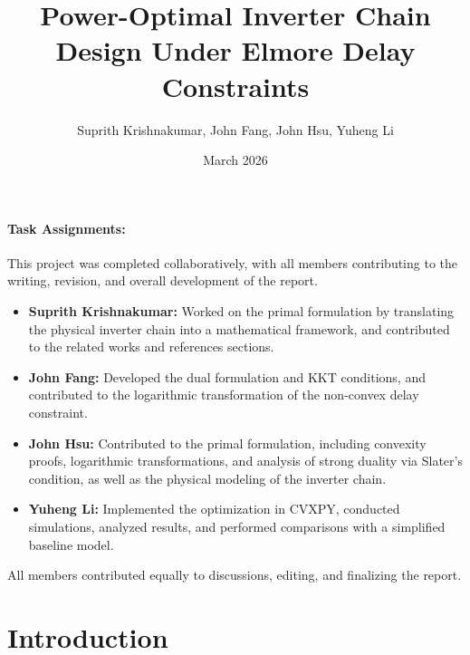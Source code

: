 \documentclass{article}
\title{Power-Optimal Inverter Chain Design Under Elmore Delay Constraints}
\author{Suprith Krishnakumar, John Fang, John Hsu, Yuheng Li}
\date{March 2026}
\begin{document}
\maketitle

\paragraph{Task Assignments:}

This project was completed collaboratively, with all members contributing to the writing, revision, and overall development of the report.

\begin{itemize}
    \item \textbf{Suprith Krishnakumar:} Worked on the primal formulation by translating the physical inverter chain into a mathematical framework, and contributed to the related works and references sections.
    
    \item \textbf{John Fang:} Developed the dual formulation and KKT conditions, and contributed to the logarithmic transformation of the non-convex delay constraint.
    
    \item \textbf{John Hsu:} Contributed to the primal formulation, including convexity proofs, logarithmic transformations, and analysis of strong duality via Slater’s condition, as well as the physical modeling of the inverter chain.
    
    \item \textbf{Yuheng Li:} Implemented the optimization in CVXPY, conducted simulations, analyzed results, and performed comparisons with a simplified baseline model.
\end{itemize}

All members contributed equally to discussions, editing, and finalizing the report.

\section{Introduction}
\end{document}
